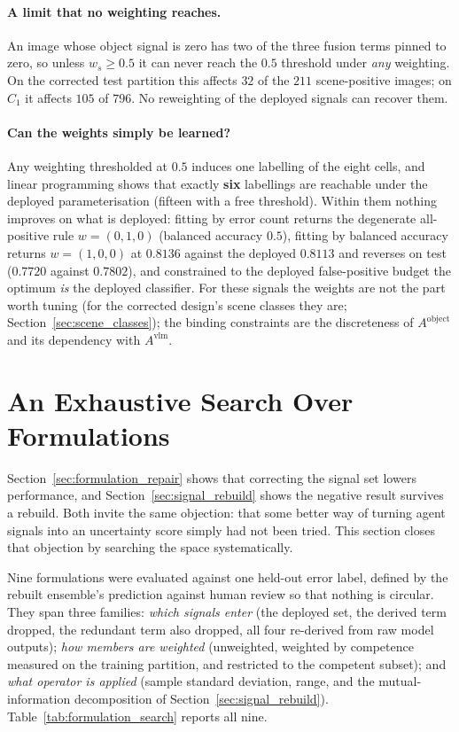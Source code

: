 \documentclass[12pt,a4paper]{report}
\begin{document}
\paragraph{A limit that no weighting reaches.} An image whose object signal is zero has two of the three fusion terms pinned to zero, so unless $w_s \ge 0.5$ it can never reach the $0.5$ threshold under \emph{any} weighting. On the corrected test partition this affects $32$ of the $211$ scene-positive images; on $C_1$ it affects $105$ of
$796$. No reweighting of the deployed signals can recover them.

\paragraph{Can the weights simply be learned?} Any weighting thresholded at $0.5$ induces one labelling of the eight cells, and linear programming shows that exactly \textbf{six} labellings are reachable under the deployed parameterisation (fifteen with a free threshold). Within them nothing improves on what is deployed: fitting by error count returns the degenerate all-positive rule $w=(0,1,0)$ (balanced accuracy $0.5$), fitting by balanced accuracy returns $w=(1,0,0)$ at $0.8136$ against the deployed $0.8113$ and reverses on test ($0.7720$ against $0.7802$), and constrained to the deployed false-positive budget the optimum \emph{is} the deployed classifier. For these signals the weights are not the part worth tuning (for the corrected design's scene classes they are; Section~\ref{sec:scene_classes}); the binding constraints are the discreteness of $A^{\text{object}}$ and its dependency with $A^{\text{vlm}}$.

\section{An Exhaustive Search Over Formulations}
\label{sec:formulation_search}

Section~\ref{sec:formulation_repair} shows that correcting the signal set lowers performance, and
Section~\ref{sec:signal_rebuild} shows the negative result survives a rebuild. Both invite the
same objection: that some better way of turning agent signals into an uncertainty score simply
had not been tried. This section closes that objection by searching the space systematically.

Nine formulations were evaluated against one held-out error label, defined by the rebuilt
ensemble's prediction against human review so that nothing is circular. They span three families:
\emph{which signals enter} (the deployed set, the derived term dropped, the redundant term also
dropped, all four re-derived from raw model outputs); \emph{how members are weighted}
(unweighted, weighted by competence measured on the training partition, and restricted to the
competent subset); and \emph{what operator is applied} (sample standard deviation, range, and the
mutual-information decomposition of Section~\ref{sec:signal_rebuild}). Table~\ref{tab:formulation_search} reports all nine.
\end{document}

